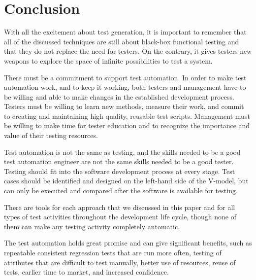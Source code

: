 \section{Conclusion}

With all the excitement about test generation, it is important to remember that
all of the discussed techniques are still about black-box functional testing and
that they do not replace the need for testers. On the contrary, it gives testers
new weapons to explore the space of infinite possibilities to test a system.

There must be a commitment to support test automation. In order to make test
automation work, and to keep it working, both testers and management have to be
willing and able to make changes in the established development process. Testers
must be willing to learn new methods, measure their work, and
commit to creating and maintaining high quality, reusable test scripts.
Management must be willing to make time for tester education and to
recognize the importance and value of their testing resources.

Test automation is not the same as testing, and the skills needed to be a
good test automation engineer are not the same skills needed to be a good tester.
Testing should fit into the software development process at every stage.
Test cases should be identified and designed on the left-hand side of the
V-model, but can only be executed and compared after the software is
available for testing.

There are tools for each approach that we discussed in this paper and for all
types of test activities throughout the development life cycle, though none of
them can make any testing activity completely automatic.

The test automation holds great promise and can give significant
benefits, such as repeatable consistent regression tests that are run more
often, testing of attributes that are difficult to test manually, better use of
resources, reuse of tests, earlier time to market, and increased confidence.